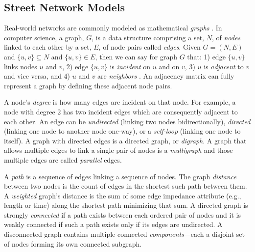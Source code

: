 \documentclass[12pt,letterpaper]{article} %
\begin{document}
\subsection{Street Network Models}

Real-world networks are commonly modeled as mathematical \textit{graphs} \citep{trudeau_introduction_1994}. In computer science, a graph, $G$, is a data structure comprising a set, $N$, of \textit{nodes} linked to each other by a set, $E$, of node pairs called \textit{edges}. Given $G = (N, E)$ and $\{u, v\} \subseteq N$ and $\{u, v\} \in E$, then we can say for graph $G$ that: 1) edge $\{u, v\}$ links nodes $u$ and $v$, 2) edge $\{u, v\}$ is \textit{incident} on $u$ and on $v$, 3) $u$ is \textit{adjacent} to $v$ and vice versa, and 4) $u$ and $v$ are \textit{neighbors} \citep{newman_networks:_2010}. An adjacency matrix can fully represent a graph by defining these adjacent node pairs.

A node's \textit{degree} is how many edges are incident on that node. For example, a node with degree 2 has two incident edges which are consequently adjacent to each other. An edge can be \textit{undirected} (linking two nodes bidirectionally), \textit{directed} (linking one node to another node one-way), or a \textit{self-loop} (linking one node to itself). A graph with directed edges is a directed graph, or \textit{digraph}. A graph that allows multiple edges to link a single pair of nodes is a \textit{multigraph} and those multiple edges are called \textit{parallel} edges.

A \textit{path} is a sequence of edges linking a sequence of nodes. The graph \textit{distance} between two nodes is the count of edges in the shortest such path between them. A \textit{weighted} graph's distance is the sum of some edge impedance attribute (e.g., length or time) along the shortest path minimizing that sum. A directed graph is strongly \textit{connected} if a path exists between each ordered pair of nodes and it is weakly connected if such a path exists only if its edges are undirected. A disconnected graph contains multiple connected \textit{components}---each a disjoint set of nodes forming its own connected subgraph.
\end{document}
